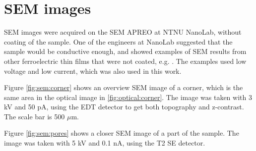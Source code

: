 














\section{SEM images}
\label{results:SEM}

SEM images were acquired on the SEM APREO at NTNU NanoLab, without coating of the sample.
One of the engineers at NanoLab suggested that the sample would be conductive enough, and showed examples of SEM results from other ferroelectric thin films that were not coated, e.g. \cite{hunnestad_visualizing_2019}.
The examples used low voltage and low current, which was also used in this work.


Figure \cref{fig:sem:corner} shows an overview SEM image of a corner, which is the same area in the optical image in \cref{fig:optical:corner}.
The image was taken with 3 kV and 50 pA, using the EDT detector to get both topography and z-contrast.
The scale bar is 500 $\mu$m.


Figure \cref{fig:sem:pores} shows a closer SEM image of a part of the sample.
The image was taken with 5 kV and 0.1 nA, using the T2 SE detector.



